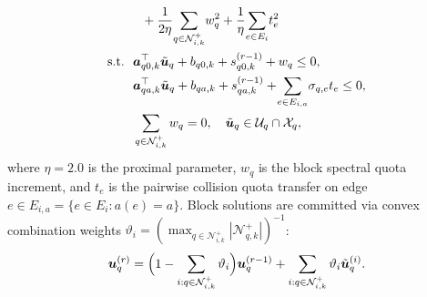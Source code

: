 \begin{enumerate}
\begin{equation}
\begin{split}
  &\quad+\frac{1}{2\eta}\!\sum_{q\in\mathcal N_{i,k}^+}\!w_q^2+\frac{1}{\eta}\!\sum_{e\in E_i}\!t_e^2\\
  \text{s.t.}\ &\ \boldsymbol a_{q0,k}^{\top}\tilde{\boldsymbol{u}}_q+b_{q0,k}+s_{q0,k}^{(r-1)}+w_q\le 0,\\
  &\ \boldsymbol a_{qa,k}^{\top}\tilde{\boldsymbol{u}}_q+b_{qa,k}+s_{qa,k}^{(r-1)}+\!\sum_{e\in E_{i,a}}\!\sigma_{q,e}t_e\le 0,\\
  &\ \sum_{q\in\mathcal N_{i,k}^+}w_q=0,\quad \tilde{\boldsymbol{u}}_q\in\mathcal U_q\cap\mathcal X_q,
 \end{split}\label{eq:block-qp}
 \end{equation}
 where $\eta=2.0$ is the proximal parameter, $w_q$ is the block spectral quota increment, and $t_e$ is the pairwise collision quota transfer on edge $e\in E_{i,a}=\{e\in E_i:a(e)=a\}$. Block solutions are committed via convex combination weights $\vartheta_i=(\max_{q\in\mathcal N_{i,k}^+}|\mathcal N_{q,k}^+|)^{-1}$:
 \begin{equation}
  \boldsymbol{u}_q^{(r)}=\Big(1-\sum_{i:q\in\mathcal N_{i,k}^+}\vartheta_i\Big)\boldsymbol{u}_q^{(r-1)}+\sum_{i:q\in\mathcal N_{i,k}^+}\vartheta_i\tilde{\boldsymbol{u}}_q^{(i)}.
  \label{eq:convex-commit}
 \end{equation}
\end{enumerate}
